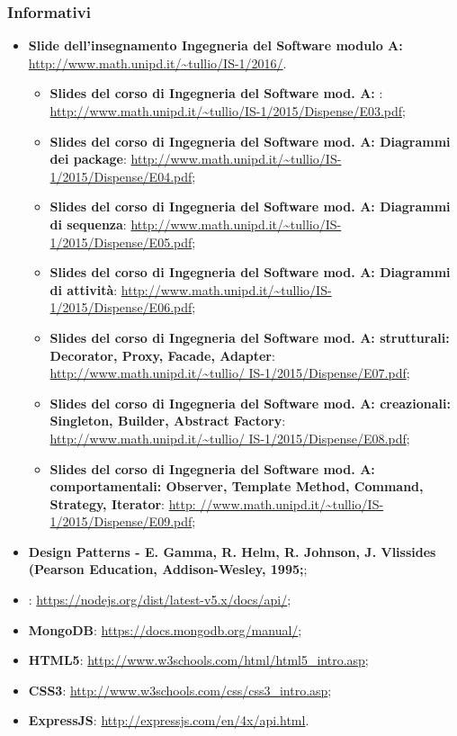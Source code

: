 \subsubsection{Informativi}
\begin{itemize}
	\item \textbf{Slide dell'insegnamento Ingegneria del Software modulo A:} \\
		\url{http://www.math.unipd.it/~tullio/IS-1/2016/}. \\
\begin{itemize}
\item \textbf{Slides del corso di Ingegneria del Software mod. A: }:
\url{http://www.math.unipd.it/~tullio/IS-1/2015/Dispense/E03.pdf};

\item  \textbf{Slides del corso di Ingegneria del Software mod. A: Diagrammi dei package}:
\url{http://www.math.unipd.it/~tullio/IS-1/2015/Dispense/E04.pdf};

\item \textbf{Slides del corso di Ingegneria del Software mod. A: Diagrammi di sequenza}:
\url{http://www.math.unipd.it/~tullio/IS-1/2015/Dispense/E05.pdf};

\item \textbf{Slides del corso di Ingegneria del Software mod. A: Diagrammi di attività}:
\url{http://www.math.unipd.it/~tullio/IS-1/2015/Dispense/E06.pdf};

\item \textbf{Slides del corso di Ingegneria del Software mod. A:  strutturali:
Decorator, Proxy, Facade, Adapter}:\url{ http://www.math.unipd.it/~tullio/
IS-1/2015/Dispense/E07.pdf};

\item \textbf{Slides del corso di Ingegneria del Software mod. A:  creazionali:
Singleton, Builder, Abstract Factory}: \url{http://www.math.unipd.it/~tullio/
IS-1/2015/Dispense/E08.pdf};

\item \textbf{Slides del corso di Ingegneria del Software mod. A:  comportamentali:
Observer, Template Method, Command, Strategy, Iterator}: \url{http:
//www.math.unipd.it/~tullio/IS-1/2015/Dispense/E09.pdf};
\end{itemize}

\item \textbf{Design Patterns - E. Gamma, R. Helm, R. Johnson, J. Vlissides (Pearson Education, Addison-Wesley, 1995;};
\item \textbf{}: \url{https://nodejs.org/dist/latest-v5.x/docs/api/};

\item\textbf{ MongoDB}: \url{https://docs.mongodb.org/manual/};
\item \textbf{HTML5}: \url{http://www.w3schools.com/html/html5_intro.asp};
\item \textbf{CSS3}: \url{http://www.w3schools.com/css/css3_intro.asp};

\item \textbf{ExpressJS}: \url{http://expressjs.com/en/4x/api.html}.

\end{itemize}


